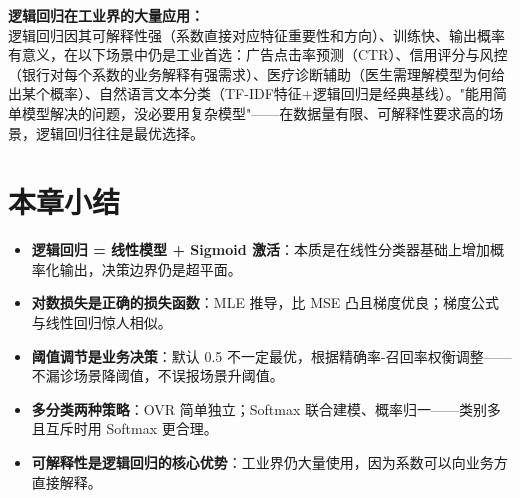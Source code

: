 \documentclass[a4paper,11pt]{ctexart}
\begin{document}
\begin{appbox}[现实应用场景]
    \textbf{逻辑回归在工业界的大量应用：}\\
    逻辑回归因其可解释性强（系数直接对应特征重要性和方向）、训练快、输出概率有意义，在以下场景中仍是工业首选：广告点击率预测（CTR）、信用评分与风控（银行对每个系数的业务解释有强需求）、医疗诊断辅助（医生需理解模型为何给出某个概率）、自然语言文本分类（TF-IDF特征+逻辑回归是经典基线）。"能用简单模型解决的问题，没必要用复杂模型"——在数据量有限、可解释性要求高的场景，逻辑回归往往是最优选择。
\end{appbox}

\section{本章小结}
\begin{itemize}
    \item \textbf{逻辑回归 = 线性模型 + Sigmoid 激活}：本质是在线性分类器基础上增加概率化输出，决策边界仍是超平面。
    \item \textbf{对数损失是正确的损失函数}：MLE 推导，比 MSE 凸且梯度优良；梯度公式与线性回归惊人相似。
    \item \textbf{阈值调节是业务决策}：默认 0.5 不一定最优，根据精确率-召回率权衡调整——不漏诊场景降阈值，不误报场景升阈值。
    \item \textbf{多分类两种策略}：OVR 简单独立；Softmax 联合建模、概率归一——类别多且互斥时用 Softmax 更合理。
    \item \textbf{可解释性是逻辑回归的核心优势}：工业界仍大量使用，因为系数可以向业务方直接解释。
\end{itemize}
\end{document}
